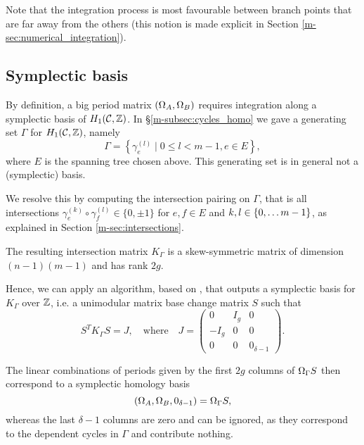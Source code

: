 \documentclass[main.tex]{subfiles}
\begin{document}
   Note that the integration process is most favourable
   between branch points that are far away from the others
   (this notion is made explicit in Section \ref{m-sec:numerical_integration}).

  \subsection{Symplectic basis}\label{subsec:symp_basis}

  By definition, a big period matrix $(\Omega_A,\Omega_B)$ requires integration along
  a symplectic basis of $H_1(\mathcal{C},\mathbb{Z})$. In \S \ref{m-subsec:cycles_homo} we gave
  a generating set $\Gamma$ for $H_1(\mathcal{C},\mathbb{Z})$, namely
  \begin{equation*}
    \Gamma = \left\{  \gamma_{e}^{(l)}  \mid  0 \le l < m-1,  e \in E  \right\},
  \end{equation*}
  where $E$ is the spanning tree chosen above. This generating set is
  in general not a (symplectic) basis.

  We resolve this by computing the intersection pairing on $\Gamma$, that
  is all intersections
  $\gamma_{e}^{(k)} \circ \gamma_{f}^{(l)}\in\{ 0,\pm 1\}$ for $e,f\in E$ and $k,l\in \left\{0,\dots m-1\right\}$,
  as explained in Section \ref{m-sec:intersections}.

  The resulting intersection matrix $K_{\Gamma}$
   is a skew-symmetric matrix of dimension $(n-1)(m-1)$
   and has rank $2g$.

   Hence, we can apply an algorithm, based on
    \cite[Theorem 18]{KB2002}, that outputs a symplectic basis
   for $K_{\Gamma}$ over $\mathbb{Z}$, i.e. a unimodular matrix base change matrix $S$ such that
  $$S^T K_{\Gamma}  S = J, \quad \text{where} \quad J = \begin{pmatrix} 0 & I_g & 0 \\ -I_g & 0 & 0 \\ 0 & 0 & 0_{\delta-1} \end{pmatrix}.$$

  The linear combinations of periods given by the first $2g$ columns of $\Omega_{\Gamma} S$ then correspond to a symplectic homology basis
  \begin{equation*}\label{eq:symp_basis}
   (\Omega_A,\Omega_B, 0_{\delta-1}) = \Omega_{\Gamma} S,
  \end{equation*}
  whereas the last $\delta-1$ columns are zero and can be ignored, as they correspond to the dependent cycles
  in $\Gamma$ and contribute nothing.

\biblio
\end{document}

